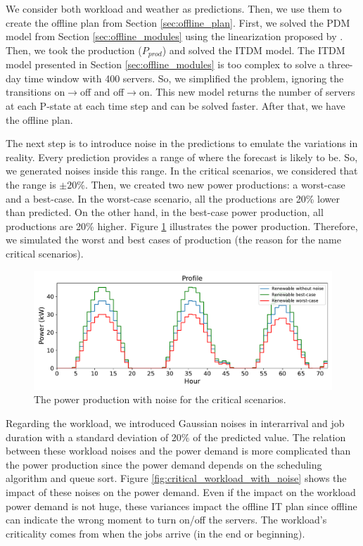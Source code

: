 We consider both workload and weather as predictions. Then, we use them to create the offline plan from Section \ref{sec:offline_plan}. First, we solved the PDM model from Section \ref{sec:offline_modules} using the linearization proposed by \citeauthor{haddad2019mixed} \cite{haddad2019mixed}. Then, we took the production ($P_{prod}$) and solved the ITDM model. The ITDM model presented in Section \ref{sec:offline_modules} is too complex to solve a three-day time window with 400 servers. So, we simplified the problem, ignoring the transitions on$\rightarrow$off and off$\rightarrow$on. This new model returns the number of servers at each P-state at each time step and can be solved faster. After that, we have the offline plan. 

The next step is to introduce noise in the predictions to emulate the variations in reality. Every prediction provides a range of where the forecast is likely to be. So, we generated noises inside this range. In the critical scenarios, we considered that the range is $\pm 20\%$. Then, we created two new power productions: a worst-case and a best-case. In the worst-case scenario, all the productions are 20\% lower than predicted. On the other hand, in the best-case power production, all productions are 20\% higher. Figure \ref{fig:critical_weather_with_noise} illustrates the power production. Therefore, we simulated the worst and best cases of production (the reason for the name critical scenarios).

\begin{figure}[!htb]
    \centering
    \includegraphics[scale=0.58]{Images/Compensations/critical_power_production_with_noise.pdf}
    \caption{The power production with noise for the critical scenarios.}
    \label{fig:critical_weather_with_noise}
\end{figure}

Regarding the workload, we introduced Gaussian noises in interarrival and job duration with a standard deviation of 20\% of the predicted value. The relation between these workload noises and the power demand is more complicated than the power production since the power demand depends on the scheduling algorithm and queue sort. Figure \ref{fig:critical_workload_with_noise} shows the impact of these noises on the power demand. Even if the impact on the workload power demand is not huge, these variances impact the offline IT plan since offline can indicate the wrong moment to turn on/off the servers. The workload's criticality comes from when the jobs arrive (in the end or beginning).

